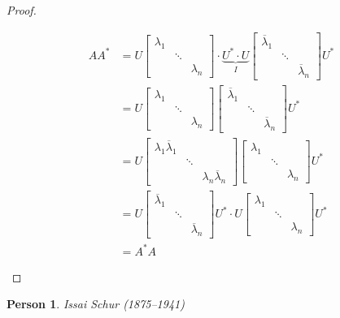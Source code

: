 \documentclass{article}
\numberwithin{lecref}{section}
\newtheorem*{person}{Person}
\begin{document}
\begin{proof}
\begin{description}
      \begin{align*}
        A A^* &= U \begin{bmatrix} \lambda_1 & & \\ & \ddots & \\ & & \lambda_n \end{bmatrix} \cdot \underbrace{U^* \cdot U}_{I} \begin{bmatrix} \overline{\lambda}_1 & & \\ & \ddots & \\ & & \overline{\lambda}_n \end{bmatrix} U^* \\
          &= U \begin{bmatrix} \lambda_1 & & \\ & \ddots & \\ & & \lambda_n \end{bmatrix} \begin{bmatrix} \overline\lambda_1 & & \\ & \ddots & \\ & & \overline\lambda_n \end{bmatrix} U^* \\
          &= U \begin{bmatrix} \lambda_1 \overline\lambda_1 & & \\ & \ddots & \\ & & \lambda_n \overline\lambda_n \end{bmatrix} \begin{bmatrix} \lambda_1 & & \\ & \ddots & \\ & & \lambda_n \end{bmatrix} U^* \\
          &= U \begin{bmatrix} \overline\lambda_1 & & \\ & \ddots & \\ & & \overline\lambda_n \end{bmatrix} U^* \cdot U \begin{bmatrix} \lambda_1 & & \\ & \ddots & \\ & & \lambda_n \end{bmatrix} U^* \\
          &= A^* A
      \end{align*}
  \end{description}
\end{proof}

\begin{person}
  Issai Schur (1875--1941)
\end{person}
\end{document}
